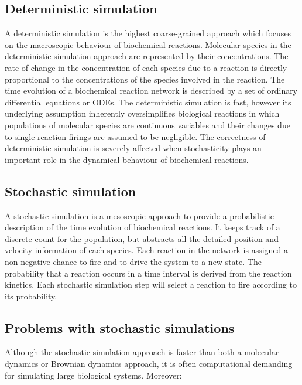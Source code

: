   \subsection{Deterministic simulation}
  A deterministic simulation is the highest coarse-grained approach which focuses on the macroscopic behaviour of biochemical reactions.
  Molecular species in the deterministic simulation approach are represented by their concentrations.
  The rate of change in the concentration of each species due to a reaction is directly proportional to the concentrations of the species involved in the reaction.
  The time evolution of a biochemical reaction network is described by a set of ordinary differential equations or ODEs.
  The deterministic simulation is fast, however its underlying assumption inherently oversimplifies biological reactions in which populations of molecular species are continuous variables and their changes due to single reaction firings are assumed to be negligible.
  The correctness of deterministic simulation is severely affected when stochasticity plays an important role in the dynamical behaviour of biochemical reactions.

  \subsection{Stochastic simulation}
  A stochastic simulation is a mesoscopic approach to provide a probabilistic description of the time evolution of biochemical reactions.
  It keeps track of a discrete count for the population, but abstracts all the detailed position and velocity information of each species.
  Each reaction in the network is assigned a non-negative chance to fire and to drive the system to a new state.
  The probability that a reaction occurs in a time interval is derived from the reaction kinetics.
  Each stochastic simulation step will select a reaction to fire according to its probability.

  \subsection{Problems with stochastic simulations}
  Although the stochastic simulation approach is faster than both a molecular dynamics or Brownian dynamics approach, it is often computational demanding for simulating large biological systems.
  Moreover:


